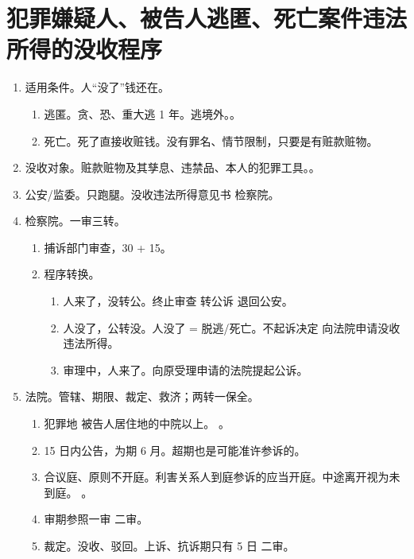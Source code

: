 \section{犯罪嫌疑人、被告人逃匿、死亡案件违法所得的没收程序}
\begin{enumerate}
  \item 适用条件。人“没了”钱还在。
        \begin{enumerate}
          \item 逃匿。贪、恐、重大逃 1 年。逃境外。。
          \item 死亡。死了直接收赃钱。没有罪名、情节限制，只要是有赃款赃物。
        \end{enumerate}
  \item 没收对象。赃款赃物及其孳息、违禁品、本人的犯罪工具。。
  \item 公安/监委。只跑腿。没收违法所得意见书 \yjt 检察院。
  \item 检察院。一审三转。
        \begin{enumerate}
          \item 捕诉部门审查，30 + 15。
          \item 程序转换。
                \begin{enumerate}
                  \item 人来了，没转公。终止审查 \yjt 转公诉 \yjt 退回公安。
                  \item 人没了，公转没。人没了 = 脱逃/死亡。不起诉决定 \yjt 向法院申请没收违法所得。
                  \item 审理中，人来了。向原受理申请的法院提起公诉。
                \end{enumerate}
        \end{enumerate}
  \item 法院。管辖、期限、裁定、救济；两转一保全。
        \begin{enumerate}
          \item 犯罪地 \hz 被告人居住地的中院以上。
                。
          \item 15 日内公告，为期 6 月。超期也是可能准许参诉的。
          \item 合议庭、原则不开庭。利害关系人到庭参诉的应当开庭。中途离开视为未到庭。
                。
          \item 审期参照一审 \hz 二审。
          \item 裁定。没收、驳回。上诉、抗诉期只有 5 日 \yjt 二审。

\end{enumerate}
\end{enumerate}
